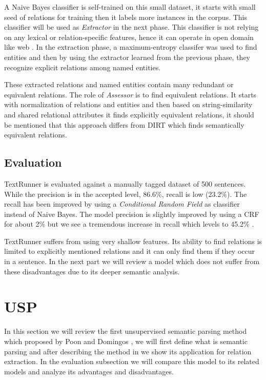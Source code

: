 \documentclass[12pt]{report}
\begin{document}
   
    
    A Naive Bayes classifier is self-trained on this small dataset, it 
   starts with small seed of relations for training then it labels more instances in the corpus. This classifier will be used as
    \emph{Extractor}
   in the next phase. This classifier is not relying on any lexical or relation-specific features, hence it can operate 
   in open domain like web \cite{Banko2009}. In the extraction phase, a maximum-entropy classifer was used to find entities and then by 
   using the extractor learned from the previous phase, they recognize explicit relations among named entities.
   
   These extracted relations and named entities contain many redundant or equivalent relations. The role of \emph{Assessor}
    is to find equivalent relations. It starts with normalization of relations and entities and then based on string-similarity
     and shared relational attributes it finds explicitly equivalent relations, it should be mentioned that 
     this approach differs from DIRT which finds semantically equivalent relations.
     
      
     
\subsection{Evaluation}
\label{ch:eval}
     
     TextRunner is evaluated against a manually tagged dataset of 500 sentences. While the precision is in 
      the accepted level, 86.6\%, recall is low (23.2\%). The recall has been improved by using a \emph{Conditional Random Field}
       \cite{Banko2009} as classifier instead of Naive Bayes. The model precision is slightly improved by using a CRF for about 2\%
        but we see a tremendous increase in recall which levels to 45.2\% . 
 
TextRunner suffers from using very shallow features. Its ability to find relations is limited to explicitly mentioned
 relations and it can only find them if they occur in a sentence. In the next part we will review a model 
 which does not suffer from these disadvantages due to its deeper semantic analysis. 
 

\section{USP}
\label{sec:usp}

In this section we will review the first unsupervised semantic parsing method which proposed by Poon and Domingos \cite{Poon2009},
we will first define what is semantic parsing and after describing the method in \cite{Poon2009} we show its application for relation extraction.
In the evaluation subsection we will compare this model to its related models and analyze its advantages and disadvantages.
\end{document}
